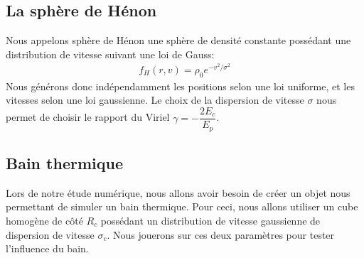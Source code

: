 



		\subsection{La sphère de Hénon}

			Nous appelons sphère de Hénon une sphère de densité
			constante possédant une distribution de vitesse suivant
			une loi de Gauss:
			\begin{align}
				f_H(r, v) = \rho_0 e^{-v^2/\sigma^2}
			\end{align}
			Nous générons donc indépendamment les positions selon une loi uniforme, et les vitesses selon
			une loi gaussienne. Le choix de la dispersion de vitesse $\sigma$ nous permet de choisir le rapport
			du Viriel $\gamma = -\dfrac{2E_c}{E_p}$.

		\subsection{Bain thermique}

			Lors de notre étude numérique, nous allons avoir besoin de créer un objet nous permettant de
			simuler un bain thermique. Pour ceci, nous allons utiliser un cube homogène de côté $R_c$
			possédant un distribution de vitesse gaussienne de dispersion de vitesse $\sigma_c$.
			Nous jouerons sur ces deux paramètres pour tester l'influence du bain.

